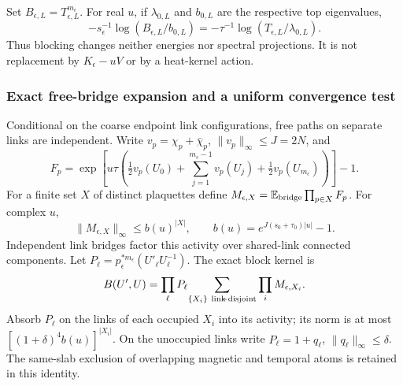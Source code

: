 Set $B_{\epsilon,L}=T_{\epsilon,L}^{m_\epsilon}$. For real $u$,
if $\lambda_{0,L}$ and $b_{0,L}$ are the respective top eigenvalues,
\begin{equation}
 -s_\epsilon^{-1}\log(B_{\epsilon,L}/b_{0,L})
 =-\tau^{-1}\log(T_{\epsilon,L}/\lambda_{0,L}).
 \label{eq:wdt-power-preserves-energy}
\end{equation}
Thus blocking changes neither energies nor spectral projections. It is not
replacement by $K_\epsilon-uV$ or by a heat-kernel action.

\subsubsection{Exact free-bridge expansion and a uniform convergence test}
Conditional on the coarse endpoint link configurations, free paths on
separate links are independent. Write $v_p=\chi_p+\bar\chi_p$,
$\|v_p\|_\infty\le J=2N$, and
\[
 F_p=\exp\!\left[u\tau\left(\tfrac12 v_p(U_0)
     +\sum_{j=1}^{m_\epsilon-1}v_p(U_j)+\tfrac12v_p(U_{m_\epsilon})\right)\right]-1.
\]
For a finite set $X$ of distinct plaquettes define
$M_{\epsilon,X}=\mathbb E_{\rm bridge}\prod_{p\in X}F_p$.
For complex $u$,
\[
 \|M_{\epsilon,X}\|_\infty\le b(u)^{|X|},\qquad
 b(u)=e^{J(s_0+\tau_0)|u|}-1.
\]
Independent link bridges factor this activity over shared-link connected
components. Let $P_\ell=p_\epsilon^{*m_\epsilon}(U'_\ell U_\ell^{-1})$.
The exact block kernel is
\[
 B(U',U)=\prod_\ell P_\ell\!
   \sum_{\{X_i\}\ {\rm link\!\!\!-disjoint}}\prod_iM_{\epsilon,X_i}.
\]
Absorb $P_\ell$ on the links of each occupied $X_i$ into its activity;
its norm is at most $[(1+\delta)^4b(u)]^{|X_i|}$. On the unoccupied links
write $P_\ell=1+q_\ell$, $\|q_\ell\|_\infty\le\delta$.
The same-slab exclusion of overlapping magnetic and temporal atoms is
retained in this identity.

